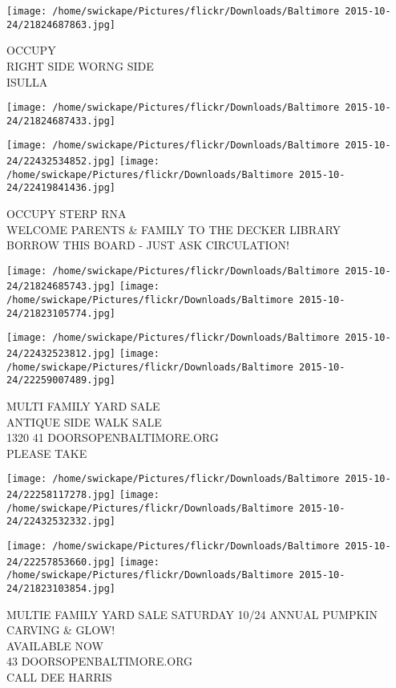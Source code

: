 \documentclass[10pt,letterpaper]{article}
\begin{document}
\vspace{0.25in}
\texttt{[image: /home/swickape/Pictures/flickr/Downloads/Baltimore 2015-10-24/21824687863.jpg]}

OCCUPY\\
RIGHT SIDE WORNG SIDE\\
ISULLA
\pagebreak

\texttt{[image: /home/swickape/Pictures/flickr/Downloads/Baltimore 2015-10-24/21824687433.jpg]}

\vspace{0.25in}
\texttt{[image: /home/swickape/Pictures/flickr/Downloads/Baltimore 2015-10-24/22432534852.jpg]}
\texttt{[image: /home/swickape/Pictures/flickr/Downloads/Baltimore 2015-10-24/22419841436.jpg]}

OCCUPY STERP RNA\\
WELCOME PARENTS \& FAMILY TO THE DECKER LIBRARY\\
BORROW THIS BOARD {-} JUST ASK CIRCULATION!
\pagebreak

\texttt{[image: /home/swickape/Pictures/flickr/Downloads/Baltimore 2015-10-24/21824685743.jpg]}
\texttt{[image: /home/swickape/Pictures/flickr/Downloads/Baltimore 2015-10-24/21823105774.jpg]}

\texttt{[image: /home/swickape/Pictures/flickr/Downloads/Baltimore 2015-10-24/22432523812.jpg]}
\texttt{[image: /home/swickape/Pictures/flickr/Downloads/Baltimore 2015-10-24/22259007489.jpg]}

MULTI FAMILY YARD SALE\\
ANTIQUE SIDE WALK SALE\\
1320 41 DOORSOPENBALTIMORE.ORG\\
PLEASE TAKE
\pagebreak

\texttt{[image: /home/swickape/Pictures/flickr/Downloads/Baltimore 2015-10-24/22258117278.jpg]}
\texttt{[image: /home/swickape/Pictures/flickr/Downloads/Baltimore 2015-10-24/22432532332.jpg]}

\texttt{[image: /home/swickape/Pictures/flickr/Downloads/Baltimore 2015-10-24/22257853660.jpg]}
\texttt{[image: /home/swickape/Pictures/flickr/Downloads/Baltimore 2015-10-24/21823103854.jpg]}

MULTIE FAMILY YARD SALE SATURDAY 10/24 ANNUAL PUMPKIN CARVING \& GLOW!\\
AVAILABLE NOW\\
43 DOORSOPENBALTIMORE.ORG\\
CALL DEE HARRIS
\pagebreak
\end{document}
